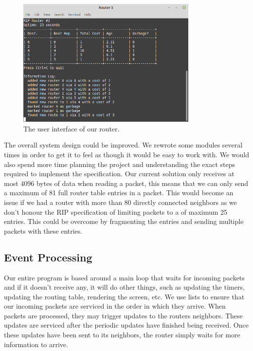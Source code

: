 \documentclass[11pt]{article} %
\begin{document}
\begin{figure}[H]
	\centering
	\includegraphics[width=0.8\textwidth]{includes/images/interface}
	\caption{The user interface of our router.}
	\label{fig:interface}
\end{figure}

The overall system design could be improved.
We rewrote some modules several times in order to get it to feel as though it would be easy to work with.
We would also spend more time planning the project and understanding the exact steps required to implement the specification.
Our current solution only receives at most 4096 bytes of data when reading a packet, this means that we can only send a maximum of 81 full router table entries in a packet. This would become an issue if we had a router with more than 80 directly connected neighbors as we don't honour the RIP specification of limiting packets to a of maximum 25 entries. This could be overcome by fragmenting the entries and sending multiple packets with these entries.


\subsection{Event Processing} \label{event_processing}

Our entire program is based around a main loop that waits for incoming packets and if it doesn't receive any, it will do other things, such as updating the timers, updating the routing table, rendering the screen, etc. We use lists to ensure that our incoming packets are serviced in the order in which they arrive. When packets are processed, they may trigger updates to the routers neighbors. These updates are serviced after the periodic updates have finished being received. Once these updates have been sent to its neighbors, the router simply waits for more information to arrive.
\end{document}
